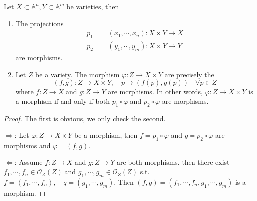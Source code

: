 \begin{proposition}\label{19}
	Let $ X\subset\mathbb{A}^n,Y \subset \mathbb{A}^m$ be varieties, then
	\begin{enumerate}
		\item The projections
		      $$\begin{array}{cc}
				      p_1 & =(x_1,\cdots,x_n): X\times Y\to X \\
				      p_2 & =(y_1,\cdots,y_m): X\times Y\to Y
			      \end{array}$$
		      are morphisms.
		\item Let $ Z $ be a variety. The morphism $ \varphi : Z\to X \times Y $ are precisely the
		      $$
			      (f,g):Z\to X\times Y,\quad p\to (f(p),g(p))\quad\forall p\in Z
		      $$
		      where $ f:Z\to X $ and $ g:Z\to Y $ are morphisms. In other words, $ \varphi:Z\to X\times Y $ is a morphism if and only if both $ p_1\circ \varphi $ and $ p_2\circ\varphi  $ are morphisms.
	\end{enumerate}
\end{proposition}
\begin{proof}
	The first is obvious, we only check the second.

	$ \Rightarrow $: Let $ \varphi:Z\to X\times Y $ be a morphism, then $ f=p_1\circ\varphi $ and $ g=p_2\circ\varphi $ are morphisms and $ \varphi=(f,g) $.

	$ \Leftarrow $: Assume $ f:Z\to X $ and $ g:Z\to Y $ are both morphisms. then there exist $ f_1,\cdots,f_n\in \mathcal{O}_Z(Z) $ and $ g_1,\cdots,g_m\in \mathcal{O}_Z(Z) $ s.t.
	$ f=(f_1,\cdots,f_n),\quad g=(g_1,\cdots,g_m) $. Then $ (f,g)=(f_1,\cdots,f_n,g_1,\cdots,g_m) $ is a morphism.
\end{proof}

